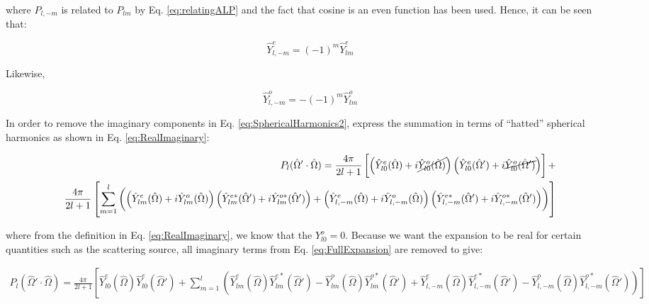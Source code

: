 \documentclass[10pt]{article}
\begin{document}
\begin{flushleft}
\begin{tcolorbox}[breakable]
where \(P_{l,-m}\) is related to \(P_{lm}\) by Eq. \eqref{eq:relatingALP} and the fact that cosine is an even function has been used. Hence, it can be seen that:

\begin{equation}
\label{eq:MinusMtoM}
\hat{Y}_{l,-m}^e=(-1)^m\hat{Y}_{lm}^e
\end{equation}

Likewise, 

\begin{equation}
\label{eq:MinusMtoMOdd}
\hat{Y}_{l,-m}^o=-(-1)^m\hat{Y}_{lm}^o
\end{equation}

\end{tcolorbox}



In order to remove the imaginary components in Eq. \eqref{eq:SphericalHarmonics2}, express the summation in terms of ``hatted'' spherical harmonics as shown in Eq. \eqref{eq:RealImaginary}:

\begin{equation}
\begin{aligned}
\label{eq:FullExpansion}
P_l(\hat{\Omega}'\cdot\hat{\Omega})=\frac{4\pi}{2l+1}\left\lbrack \left(\hat{Y}_{l0}^e(\hat{\Omega})+i\cancel{\hat{Y}_{l0}^o(\hat{\Omega})}\right)\left(\hat{Y}_{l0}^e(\hat{\Omega}')+i\cancel{\hat{Y}_{l0}^o(\hat{\Omega}')}\right)\right\rbrack+\\
\frac{4\pi}{2l+1}\left\lbrack\sum_{m=1}^{l}\left(\left(\hat{Y}_{lm}^e(\hat{\Omega})+i\hat{Y}_{lm}^o(\hat{\Omega})\right)\left(\hat{Y}_{lm}^{e*}(\hat{\Omega}')+i\hat{Y}_{lm}^{o*}(\hat{\Omega}')\right)+\left(\hat{Y}_{l,-m}^e(\hat{\Omega})+i\hat{Y}_{l,-m}^o(\hat{\Omega})\right)\left(\hat{Y}_{l,-m}^{e*}(\hat{\Omega}')+i\hat{Y}_{l,-m}^{o*}(\hat{\Omega}')\right)\right)\right\rbrack\\
\end{aligned}
\end{equation}

where from the definition in Eq. \eqref{eq:RealImaginary}, we know that the \(Y_{l0}^o=0\). Because we want the expansion to be real for certain quantities such as the scattering source, all imaginary terms from Eq. \eqref{eq:FullExpansion} are removed to give:

\begin{equation}
\begin{aligned}
\label{eq:FullExpansion2}
P_l(\hat{\Omega}'\cdot\hat{\Omega})=\frac{4\pi}{2l+1}\left\lbrack \hat{Y}_{l0}^e(\hat{\Omega})\hat{Y}_{l0}^e(\hat{\Omega}')+\sum_{m=1}^{l}\left(\hat{Y}_{lm}^e(\hat{\Omega})\hat{Y}_{lm}^{e*}(\hat{\Omega}')-\hat{Y}_{lm}^o(\hat{\Omega})\hat{Y}_{lm}^{o*}(\hat{\Omega}')+\hat{Y}_{l,-m}^e(\hat{\Omega})\hat{Y}_{l,-m}^{e*}(\hat{\Omega}')-\hat{Y}_{l,-m}^o(\hat{\Omega})\hat{Y}_{l,-m}^{o*}(\hat{\Omega}')\right)\right\rbrack\\
\end{aligned}
\end{equation}


\end{flushleft}
\end{document}
